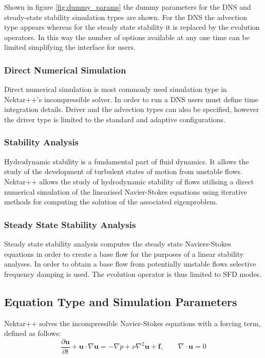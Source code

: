 \documentclass[11pt, a4paper]{report}
\begin{document}
Shown in figure \ref{fig:dummy_params} the dummy parameters for the DNS and steady-state stability simulation types are shown. For the DNS the advection type appears whereas for the steady state stability it is replaced by the evolution operators. In this way the number of options available at any one time can be limited simplifying the interface for users.

\subsubsection{Direct Numerical Simulation}
Direct numerical simulation is most commonly used simulation type in Nektar++'s incompressible solver. In order to run a DNS users must define time integration details. Driver and the advection types can also be specified, however the driver type is limited to the standard and adaptive configurations.

\subsubsection{Stability Analysis}
Hydrodynamic stability is a fundamental part of fluid dynamics. It allows the study of the development of turbulent states of motion from unstable flows. Nektar++ allows the study of  hydrodynamic stability of flows utilising a direct numerical simulation of the linearised Navier-Stokes equations using iterative methods for computing the solution of the associated eigenproblem.

\subsubsection{Steady State Stability Analysis}
Steady state stability analysis computes the steady state Naviers-Stokes equations in order to create a base flow for the purposes of a linear stability analyses. In order to obtain a base flow from potentially unstable flows selective frequency damping is used. The evolution operator is thus limited to SFD modes.

\subsection{Equation Type and Simulation Parameters}
Nektar++ solves the incompressible Navier-Stokes equations with a forcing term, defined as follows:
\begin{equation}
\frac{\partial \mathbf{u}}{\partial t} + \mathbf{u} \cdot \nabla \mathbf{u} = - \nabla p + \nu \nabla^{2} \mathbf{u} + \mathbf{f}, \qquad \nabla \cdot \mathbf{u} = 0
\label{eq:IncNS}
\end{equation}
\end{document}
